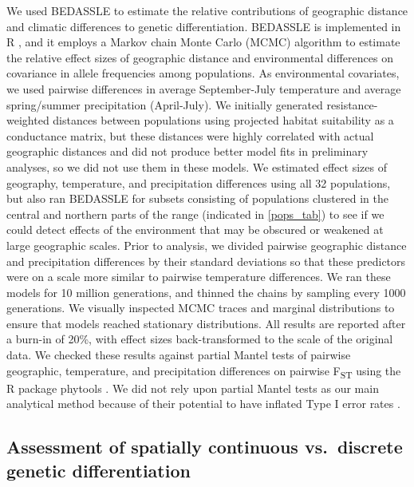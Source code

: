\documentclass{article}
\begin{document}
We used BEDASSLE \citep{bradburd2013disentangling} to estimate the relative contributions of geographic distance and climatic differences to genetic differentiation. BEDASSLE is implemented in R \citep{Rcore}, and it employs a Markov chain Monte Carlo (MCMC) algorithm to estimate the relative effect sizes of geographic distance and environmental differences on covariance in allele frequencies among populations. As environmental covariates, we used pairwise differences in average September-July temperature and average spring/summer precipitation (April-July). We initially generated resistance-weighted distances between populations using projected habitat suitability as a conductance matrix, but these distances were highly correlated with actual geographic distances and did not produce better model fits in preliminary analyses, so we did not use them in these models. We estimated effect sizes of geography, temperature, and precipitation differences using all 32 populations, but also ran BEDASSLE for subsets consisting of populations clustered in the central and northern parts of the range (indicated in \autoref{pops_tab}) to see if we could detect effects of the environment that may be obscured or weakened at large geographic scales. Prior to analysis, we divided pairwise geographic distance and precipitation differences by their standard deviations so that these predictors were on a scale more similar to pairwise temperature differences. We ran these models for 10 million generations, and thinned the chains by sampling every 1000 generations. We visually inspected MCMC traces and marginal distributions to ensure that models reached stationary distributions. All results are reported after a burn-in of 20\%, with effect sizes back-transformed to the scale of the original data. We checked these results against partial Mantel tests of pairwise geographic, temperature, and precipitation differences on pairwise F\textsubscript{ST} using the R package phytools \citep{phytools}. We did not rely upon partial Mantel tests as our main analytical method because of their potential to have inflated Type I error rates \citep{guillot2013dismantling}.

\subsection*{Assessment of spatially continuous vs.\ discrete genetic differentiation}
\end{document}
